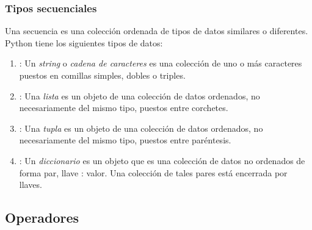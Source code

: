     \subsubsection{Tipos secuenciales}\label{subsubsec: Tipos_secuenciales}
    Una secuencia es una colección ordenada de tipos de datos similares o diferentes. Python tiene los siguientes tipos de datos:
    \begin{enumerate}
        \item {}: Un \emph{string} o \emph{cadena de caracteres} es una colección de uno o más caracteres puestos en comillas simples, dobles o triples.
        \item {}: Una \emph{lista} es un objeto de una colección de datos ordenados, no necesariamente del mismo tipo, puestos entre corchetes.
        \item {}: Una \emph{tupla} es un objeto de una colección de datos ordenados, no necesariamente del mismo tipo, puestos entre paréntesis.
        \item {}: Un \emph{diccionario} es un objeto que es una colección de datos no ordenados de forma par, llave : valor. Una colección de tales pares está encerrada por llaves. 
    \end{enumerate}
	\subsection{Operadores}
